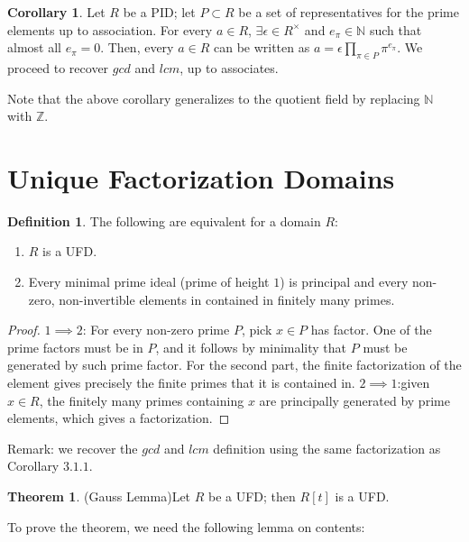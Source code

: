 \documentclass{article}
\theoremstyle{definition}
\newtheorem{theorem}{Theorem}[section]
\theoremstyle{definition}
\theoremstyle{definition}
\theoremstyle{definition}
\theoremstyle{definition}
\newtheorem{definition}{Definition}[section]
\theoremstyle{definition}
\newtheorem{corollary}{Corollary}[theorem]
\theoremstyle{definition}
\begin{document}
\begin{tcolorbox}[colback=green!5!white,colframe=green!30!white]
\begin{corollary}
    Let $R$ be a PID; let $P\subset R$ be a set of representatives for the prime elements up to association. For every $a\in R$, $\exists \epsilon\in R^{\times} $ and $e_{\pi}\in \mathbb{N} $ such that almost all $e_{\pi}=0$. Then, every $a\in R$ can be written as $a=\epsilon\prod_{\pi\in P}\pi^{e_{\pi}}$. We proceed to recover $gcd$ and $lcm$, up to associates.
\end{corollary}
\end{tcolorbox}

Note that the above corollary generalizes to the quotient field by replacing $\mathbb{N}$ with $\mathbb{Z}$.

\section{Unique Factorization Domains}


\begin{tcolorbox}[colback=purple!5!white,colframe=purple!75!black]
\begin{definition}
  The following are equivalent for a domain $R$:
  \begin{enumerate}
    \item $R$ is a UFD.
    \item Every  minimal prime ideal (prime of height $1$) is principal and every non-zero, non-invertible elements in contained in finitely many primes. 
  \end{enumerate}
\end{definition}
\end{tcolorbox}


\begin{proof}
   $1\implies 2$: For every non-zero prime $P$, pick $x\in P$ has factor. One of the prime factors must be in $P$, and it follows by minimality that $P$ must be generated by such prime factor. For the second part, the finite factorization of the element gives precisely the finite primes that it is contained in. 
   $2\implies 1$:given $x\in R$, the finitely many primes containing $x$ are principally generated by prime elements, which gives a factorization.

   
\end{proof}
Remark: we recover the $gcd$ and $lcm$ definition using the same factorization as Corollary $3.1.1$.


\begin{tcolorbox}[colback=red!5!white,colframe=red!30!white]
\begin{theorem}
    (Gauss Lemma)Let $R$ be a UFD; then $R[t]$ is a UFD. 
\end{theorem}
\end{tcolorbox}
To prove the theorem, we need the following lemma on contents:
\end{document}

